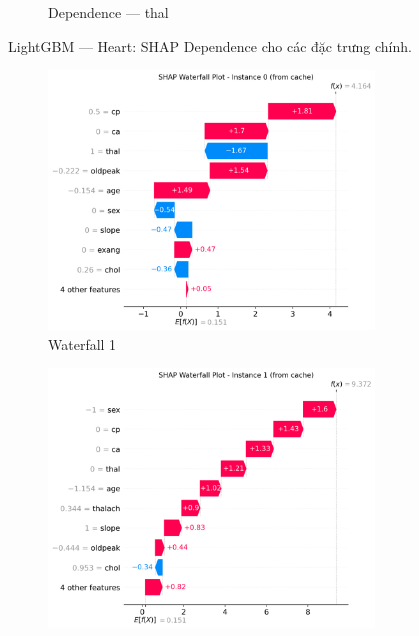 \begin{figure}[H]
\begin{subfigure}[b]{0.31\textwidth}
\caption{Dependence — thal}\label{fig:lgbm_heart_dep_thal}
\end{subfigure}
\caption{LightGBM — Heart: SHAP Dependence cho các đặc trưng chính.}
\label{fig:lgbm_heart_dependences}
\end{figure}

\begin{figure}[H]
\centering
\begin{subfigure}[b]{0.31\textwidth}\centering
\includegraphics[width=0.95\textwidth]{Result/heart_dataset/LightGBM/SHAP/Waterfall 1.png}
\caption{Waterfall 1}\label{fig:lgbm_heart_waterfall1}
\end{subfigure}\hfill
\begin{subfigure}[b]{0.31\textwidth}\centering
\includegraphics[width=0.95\textwidth]{Result/heart_dataset/LightGBM/SHAP/Waterfall 2.png}

\end{subfigure}
\end{figure}

